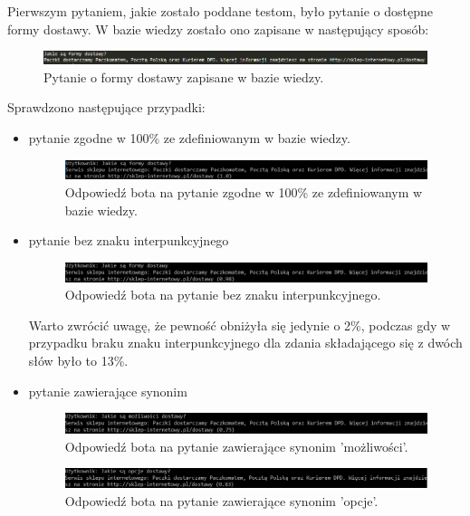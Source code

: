Pierwszym pytaniem, jakie zostało poddane testom, było pytanie o dostępne formy dostawy. W bazie wiedzy zostało ono zapisane w następujący sposób:

\begin{figure}[ht]
	{\centering
		\includegraphics[width=0.9\linewidth]{rys/rys03/8}
	\caption{Pytanie o formy dostawy zapisane w bazie wiedzy.}
	}
	\label{fig:bot4}
\end{figure}

Sprawdzono następujące przypadki:

\begin{itemize}
	\item
	pytanie zgodne w 100\% ze zdefiniowanym w bazie wiedzy.
	\begin{figure}[ht]
	{\centering
		\includegraphics[width=0.9\linewidth]{rys/rys03/9}
	\caption{Odpowiedź bota na pytanie zgodne w 100\% ze zdefiniowanym w bazie wiedzy.}
	}
	\label{fig:bot4}
    \end{figure}
\newpage
	\item
	pytanie bez znaku interpunkcyjnego
		\begin{figure}[ht]
	{\centering
		\includegraphics[width=0.9\linewidth]{rys/rys03/10}
	\caption{Odpowiedź bota na pytanie bez znaku interpunkcyjnego.}
	}
	\label{fig:bot4}
    \end{figure}
    
    Warto zwrócić uwagę, że pewność obniżyła się jedynie o 2\%, podczas gdy w przypadku braku znaku interpunkcyjnego dla zdania składającego się z dwóch słów było to 13\%.
	\item
	pytanie zawierające synonim
	\begin{figure}[ht]
	{\centering
		\includegraphics[width=0.9\linewidth]{rys/rys03/11}
	\caption{Odpowiedź bota na pytanie zawierające synonim 'możliwości'.}
	}
	\label{fig:bot4}
    \end{figure}
    
    \begin{figure}[ht]
	{\centering
		\includegraphics[width=0.9\linewidth]{rys/rys03/12}
	\caption{Odpowiedź bota na pytanie zawierające synonim 'opcje'.}
	}
	\label{fig:bot4}
    \end{figure}
    

\end{itemize}
